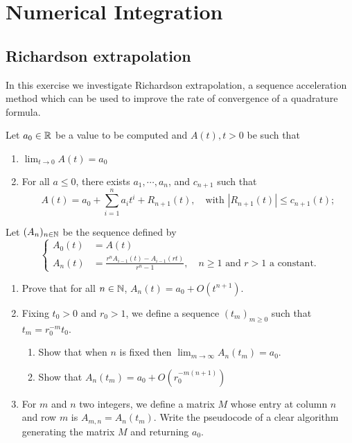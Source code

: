 \renewcommand{\chaptername}{Assignment}
\chapter{Numerical Integration}

\section{Richardson extrapolation}
In this exercise we investigate Richardson extrapolation, a sequence acceleration method which can be used to improve the rate of convergence of a quadrature formula.

Let \(a_0\in\mathbb{R}\) be a value to be computed and \(A(t), t > 0\) be such that
\begin{enumerate}
	\item \(\lim_{t\to0}A(t)=a_0\)
	\item For all \(a\leq0\), there exists \(a_1,\cdots,a_n\), and \(c_{n+1}\) such that
	\[ A(t)=a_0+\sum_{i=1}^{n}a_i t^i+R_{n+1}(t),\quad\text{with } |R_{n+1}(t)|\leq c_{n+1}(t);  \]
\end{enumerate}
Let \((A_n)_{n\in\mathbb{N}}\) be the sequence defined by
\[ \begin{cases} A_0(t)&= A(t) \\ A_n(t)&=\frac{r^nA_{i-1}(t)-A_{i-1}(rt)}{r^n-1},\quad n\geq1 \text{ and } r>1 \text{ a constant.} \end{cases} \]
\begin{enumerate}
	\item Prove that for all \(n\in\mathbb{N}\), \(A_n(t)= a_0 + O(t^{n+1})\).
	\item Fixing \(t_0 > 0\) and \(r_0 > 1\), we define a sequence \((t_m)_{m\geq0}\) such that \(t_m = r_0^{-m} t_0\).
	\begin{enumerate}
		\item Show that when $n$ is fixed then \(\lim_{m\to\infty}A_n(t_m)=a_0\).
		\item Show that \(A_n(t_m)=a_0+O(r_0^{-m(n+1)}) \)
	\end{enumerate}
	\item For $m$ and $n$ two integers, we define a matrix $M$ whose entry at column $n$ and row $m$ is \(A_{m,n}=A_n(t_m)\).
	Write the pseudocode of a clear algorithm generating the matrix $M$ and returning $a_0$.
\end{enumerate}


